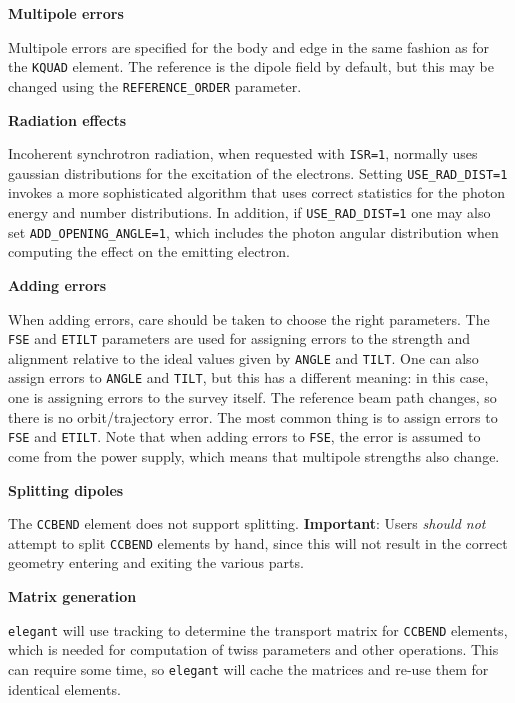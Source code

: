 {\bf Multipole errors}

Multipole errors are specified for the body and edge in the same fashion as for the
\verb|KQUAD| element.
The reference is the dipole field by default, but this may be changed using the
\verb|REFERENCE_ORDER| parameter.

{\bf Radiation effects}

Incoherent synchrotron radiation, when requested with {\tt ISR=1},
normally uses gaussian distributions for the excitation of the electrons.
Setting {\tt USE\_RAD\_DIST=1} invokes a more sophisticated algorithm that
uses correct statistics for the photon energy and number distributions.
In addition, if {\tt USE\_RAD\_DIST=1} one may also set {\tt ADD\_OPENING\_ANGLE=1},
which includes the photon angular distribution when computing the effect on 
the emitting electron.  

{\bf Adding errors}

When adding errors, care should be taken to choose the right
parameters.  The \verb|FSE| and \verb|ETILT| parameters are used for
assigning errors to the strength and alignment relative to the ideal
values given by \verb|ANGLE| and \verb|TILT|.  One can also assign 
errors to \verb|ANGLE| and \verb|TILT|, but this has a different meaning:
in this case, one is assigning errors to the survey itself.  The reference
beam path changes, so there is no orbit/trajectory error. The most common
thing is to assign errors to \verb|FSE| and \verb|ETILT|.  Note that when
adding errors to \verb|FSE|, the error is assumed to come from the power
supply, which means that multipole strengths also change.

{\bf Splitting dipoles}

The \verb|CCBEND| element does not support splitting.
{\bf Important}: Users {\em should not} attempt to split \verb|CCBEND| elements by hand, since this
will not result in the correct geometry entering and exiting the various parts.

{\bf Matrix generation}

{\tt elegant} will use tracking to determine the transport matrix for \verb|CCBEND| elements, which 
is needed for computation of twiss parameters and other operations.
This can require some time, so {\tt elegant} will cache the matrices and re-use them for
identical elements.

